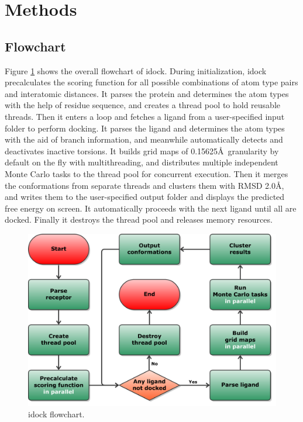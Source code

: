 \section{Methods}

\subsection{Flowchart}

Figure \ref{idock:Flowchart} shows the overall flowchart of idock. During initialization, idock precalculates the scoring function for all possible combinations of atom type pairs and interatomic distances. It parses the protein and determines the atom types with the help of residue sequence, and creates a thread pool to hold reusable threads. Then it enters a loop and fetches a ligand from a user-specified input folder to perform docking. It parses the ligand and determines the atom types with the aid of branch information, and meanwhile automatically detects and deactivates inactive torsions. It builds grid maps of 0.15625\AA\ granularity by default on the fly with multithreading, and distributes multiple independent Monte Carlo tasks to the thread pool for concurrent execution. Then it merges the conformations from separate threads and clusters them with RMSD 2.0\AA, and writes them to the user-specified output folder and displays the predicted free energy on screen. It automatically proceeds with the next ligand until all are docked. Finally it destroys the thread pool and releases memory resources.

\begin{figure}
\centering
\includegraphics[width=\linewidth]{../idock/Flowchart.pdf}
\caption{idock flowchart.}
\label{idock:Flowchart}
\end{figure}

